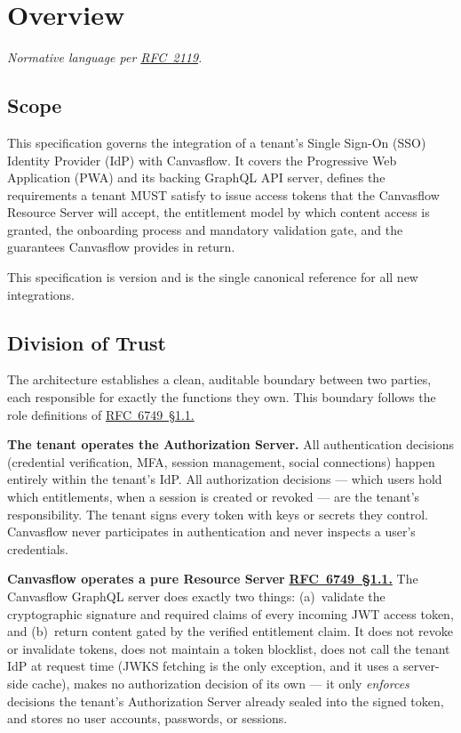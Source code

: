 \section{Overview}


\textit{Normative language per \href{https://tools.ietf.org/html/rfc2119}{RFC~2119}.}

\subsection{Scope}

This specification governs the integration of a tenant's Single Sign-On (SSO)
Identity Provider (IdP) with Canvasflow. It covers the Progressive Web Application (PWA)
and its backing GraphQL API server, defines the requirements a tenant MUST satisfy to
issue access tokens that the Canvasflow Resource Server will accept, the entitlement
model by which content access is granted, the onboarding process and mandatory
validation gate, and the guarantees Canvasflow provides in return.

This specification is version \specversion{} and is the single canonical reference for 
all new integrations.

\subsection{Division of Trust}
The architecture establishes a clean, auditable boundary between two parties, each
responsible for exactly the functions they own. This boundary follows the role
definitions of \href{https://datatracker.ietf.org/doc/html/rfc6749#section-1.1}{RFC~6749~\S1.1.}

\textbf{The tenant operates the Authorization Server.} All authentication decisions
(credential verification, MFA, session management, social connections) happen entirely
within the tenant's IdP. All authorization decisions --- which users hold which
entitlements, when a session is created or revoked --- are the tenant's responsibility.
The tenant signs every token with keys or secrets they control. Canvasflow never
participates in authentication and never inspects a user's credentials.


\textbf{Canvasflow operates a pure Resource Server} \href{https://datatracker.ietf.org/doc/html/rfc6749#section-1.1}{\textbf{RFC~6749~\S1.1.}} The Canvasflow
GraphQL server does exactly two things: (a)~validate the cryptographic signature and
required claims of every incoming JWT access token, and (b)~return content gated by the
verified entitlement claim. It does not revoke or invalidate tokens, does not maintain
a token blocklist, does not call the tenant IdP at request time (JWKS fetching is the
only exception, and it uses a server-side cache), makes no authorization decision of its
own --- it only \emph{enforces} decisions the tenant's Authorization Server already sealed
into the signed token, and stores no user accounts, passwords, or sessions.

